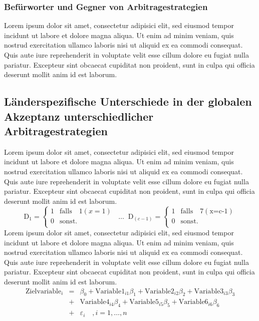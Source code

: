 \subsubsection{Befürworter und Gegner von Arbitragestrategien}
Lorem ipsum dolor sit amet, consectetur adipisici elit, sed eiusmod tempor incidunt ut labore et dolore magna aliqua. Ut enim ad minim veniam, quis nostrud exercitation ullamco laboris nisi ut aliquid ex ea commodi consequat. Quis aute iure reprehenderit in voluptate velit esse cillum dolore eu fugiat nulla pariatur. Excepteur sint obcaecat cupiditat non proident, sunt in culpa qui officia deserunt mollit anim id est laborum.

\subsection{Länderspezifische Unterschiede in der globalen Akzeptanz unterschiedlicher Arbitragestrategien}
Lorem ipsum dolor sit amet, consectetur adipisici elit, sed eiusmod tempor incidunt ut labore et dolore magna aliqua. Ut enim ad minim veniam, quis nostrud exercitation ullamco laboris nisi ut aliquid ex ea commodi consequat. Quis aute iure reprehenderit in voluptate velit esse cillum dolore eu fugiat nulla pariatur. Excepteur sint obcaecat cupiditat non proident, sunt in culpa qui officia deserunt mollit anim id est laborum.
%
\begin{equation*}
\text{D}_{1} = \begin{cases}
 1 & \text{falls}\quad 1(x=1)\\ 
0 & \text{sonst.}\\
\end{cases}
\;\;
\mathbf{\dotsc}
\;\;
\text{D}_{(c-1)} = \begin{cases}
 1 & \text{falls}\quad 7(\text{x=c-1})\\ 
0 & \text{sonst.}\\
\end{cases}
\end{equation*}
%
Lorem ipsum dolor sit amet, consectetur adipisici elit, sed eiusmod tempor incidunt ut labore et dolore magna aliqua. Ut enim ad minim veniam, quis nostrud exercitation ullamco laboris nisi ut aliquid ex ea commodi consequat. Quis aute iure reprehenderit in voluptate velit esse cillum dolore eu fugiat nulla pariatur. Excepteur sint obcaecat cupiditat non proident, sunt in culpa qui officia deserunt mollit anim id est laborum.
%
\begin{eqnarray}
\text{Zielvariable}_i &=&\beta_0+\text{Variable1}_{i1} \beta_{1}+\text{Variable2}_{i2} \beta_{2}+\text{Variable3}_{i3} \beta_{3}\nonumber\\
& +&\text{Variable4}_{i4} \beta_{4}+\text{Variable5}_{i5} \beta_{5}+\text{Variable6}_{i6} \beta_{6}\\
& +& \varepsilon_i \quad, i=1, \ldots, n\nonumber
\end{eqnarray} 
